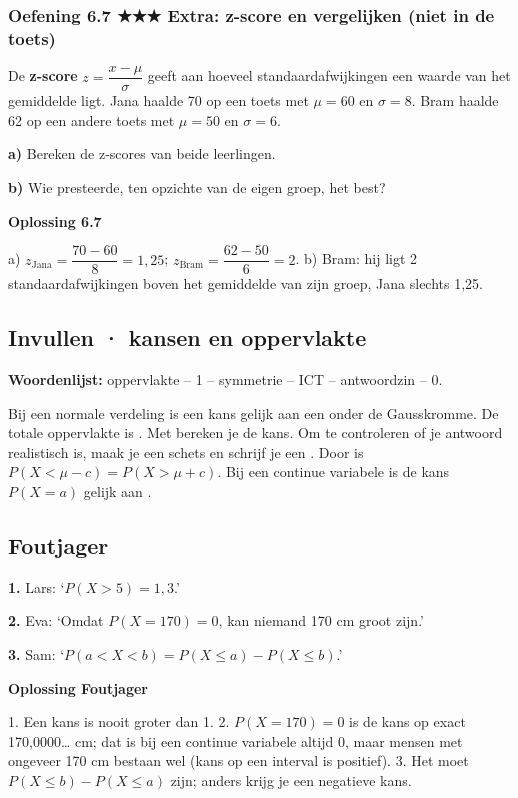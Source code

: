 \subsubsection*{Oefening 6.7 \quad ★★★ \quad Extra: z-score en vergelijken (niet in de toets)}

De \textbf{z-score} $z=\dfrac{x-\mu}{\sigma}$ geeft aan hoeveel standaardafwijkingen een waarde van het gemiddelde ligt. Jana haalde 70 op een toets met $\mu=60$ en $\sigma=8$. Bram haalde 62 op een andere toets met $\mu=50$ en $\sigma=6$.

\textbf{a)} Bereken de z-scores van beide leerlingen. \lijn

\textbf{b)} Wie presteerde, ten opzichte van de eigen groep, het best? \lijn

\begin{oplossing}
\textbf{Oplossing 6.7}

a) $z_{\text{Jana}}=\dfrac{70-60}{8}=1{,}25$; $z_{\text{Bram}}=\dfrac{62-50}{6}=2$. b) Bram: hij ligt 2 standaardafwijkingen boven het gemiddelde van zijn groep, Jana slechts 1,25.
\end{oplossing}

\subsection*{Invullen · kansen en oppervlakte}

\textbf{Woordenlijst:} oppervlakte – 1 – symmetrie – ICT – antwoordzin – 0.

Bij een normale verdeling is een kans gelijk aan een  onder de Gausskromme. De totale oppervlakte is . Met  bereken je de kans. Om te controleren of je antwoord realistisch is, maak je een schets en schrijf je een . Door  is $P(X<\mu-c)=P(X>\mu+c)$. Bij een continue variabele is de kans $P(X=a)$ gelijk aan .

\subsection*{Foutjager}

\textbf{1.} Lars: ‘$P(X>5)=1{,}3$.’ \lijn

\textbf{2.} Eva: ‘Omdat $P(X=170)=0$, kan niemand 170 cm groot zijn.’ \lijn

\textbf{3.} Sam: ‘$P(a<X<b)=P(X\le a)-P(X\le b)$.’ \lijn

\begin{oplossing}
\textbf{Oplossing Foutjager}

1. Een kans is nooit groter dan 1. 2. $P(X=170)=0$ is de kans op exact 170,0000… cm; dat is bij een continue variabele altijd 0, maar mensen met ongeveer 170 cm bestaan wel (kans op een interval is positief). 3. Het moet $P(X\le b)-P(X\le a)$ zijn; anders krijg je een negatieve kans.
\end{oplossing}


